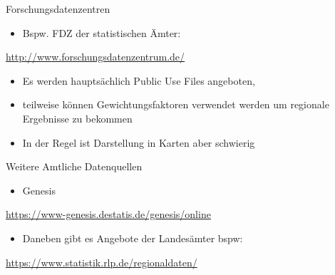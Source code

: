 \documentclass[ignorenonframetext,]{beamer}
\providecommand{\tightlist}{%
  \setlength{\itemsep}{0pt}\setlength{\parskip}{0pt}}
\begin{document}
\begin{frame}{Forschungsdatenzentren}

\begin{itemize}
\tightlist
\item
  Bspw. FDZ der statistischen Ämter:
\end{itemize}

\url{http://www.forschungsdatenzentrum.de/}

\begin{itemize}
\item
  Es werden hauptsächlich Public Use Files angeboten,
\item
  teilweise können Gewichtungsfaktoren verwendet werden um regionale
  Ergebnisse zu bekommen
\item
  In der Regel ist Darstellung in Karten aber schwierig
\end{itemize}

\end{frame}

\begin{frame}{Weitere Amtliche Datenquellen}

\begin{itemize}
\tightlist
\item
  Genesis
\end{itemize}

\url{https://www-genesis.destatis.de/genesis/online}

\begin{itemize}
\tightlist
\item
  Daneben gibt es Angebote der Landesämter bspw:
\end{itemize}

\url{https://www.statistik.rlp.de/regionaldaten/}

\end{frame}
\end{document}
